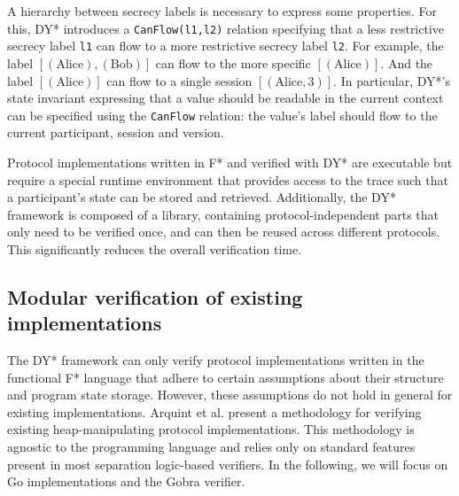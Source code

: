 A hierarchy between secrecy labels is necessary to express some properties. For this, DY* introduces a \texttt{CanFlow(l1,l2)} relation specifying that a less restrictive secrecy label \texttt{l1} can flow to a more restrictive secrecy label \texttt{l2}.
For example, the label $[(\text{Alice}), (\text{Bob})]$ can flow to the more specific $[(\text{Alice})]$. And the label $[(\text{Alice})]$ can flow to a single session $[(\text{Alice}, 3)]$.
In particular, DY*'s state invariant expressing that a value should be readable in the current context can be specified using the \texttt{CanFlow} relation: the value's label should flow to the current participant, session and version.

Protocol implementations written in F* and verified with DY* are executable but require a special runtime environment that provides access to the trace such that a participant's state can be stored and retrieved.
Additionally, the DY* framework is composed of a library, containing protocol-independent parts that only need to be verified once, and can then be reused across different protocols. This significantly reduces the overall verification time.

\subsection{Modular verification of existing implementations}
\label{sec:modular-verification-of-existing-implementations}

The DY* framework can only verify protocol implementations written in the functional F* language that adhere to certain assumptions about their structure and program state storage.
However, these assumptions do not hold in general for existing implementations.
Arquint et al.\cite{} present a methodology for verifying existing heap-manipulating protocol implementations. This methodology is agnostic to the programming language and relies only on standard features present in most separation logic-based verifiers. In the following, we will focus on Go implementations and the Gobra\cite{} verifier.

